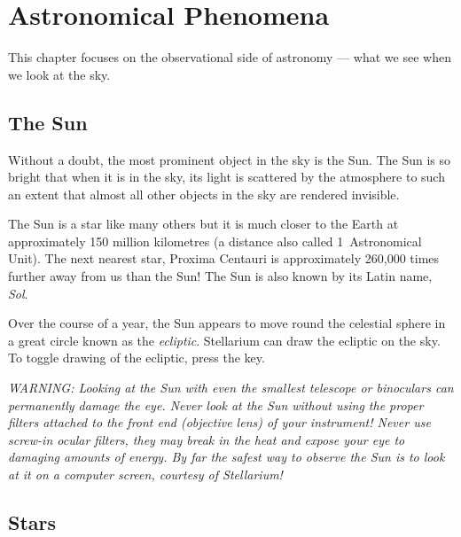 


\chapter{Astronomical Phenomena}
\label{ch:Phenomena}

This chapter focuses on the observational side of astronomy --- what we
see when we look at the sky.

\section{The Sun}
\label{sec:Phenomena:sun}

Without a doubt, the most prominent object in the sky is the Sun. The
Sun is so bright that when it is in the sky, its light is scattered by
the atmosphere to such an extent that almost all other objects in the
sky are rendered invisible.

The Sun is a star like many others but it is much closer to the Earth
at approximately 150 million kilometres (a distance also called
1~Astronomical Unit). The next nearest star, Proxima Centauri is
approximately 260,000 times further away from us than the Sun! The Sun
is also known by its Latin name, \emph{Sol}.

Over the course of a year, the Sun appears to move round the celestial
sphere in a great circle known as the \emph{ecliptic}. Stellarium can
draw the ecliptic on the sky. To toggle drawing of the ecliptic, press
the \key{,} key.

\emph{WARNING: Looking at the Sun with even the smallest telescope or
  binoculars can permanently damage the eye. Never look at the Sun
  without using the proper filters attached to the front end
  (objective lens) of your instrument! Never use screw-in ocular
  filters, they may break in the heat and expose your eye to damaging
  amounts of energy. By far the safest way to observe the Sun is to
  look at it on a computer screen, courtesy of Stellarium!}

\section{Stars}
\label{sec:Phenomena:stars}

